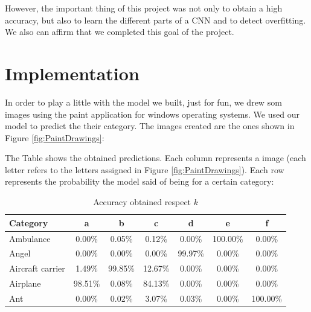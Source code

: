 \documentclass{article}
\begin{document}
However, the important thing of this project was not only to obtain a high accuracy, but also to learn the different parts of a CNN and to detect overfitting. We also can affirm that we completed this goal of the project.

\section{Implementation}
In order to play a little with the model we built, just for fun, we drew som images using the paint application for windows operating systems. We used our model to predict the their category. The images created are the ones shown in Figure \ref{fig:PaintDrawings}:


The Table shows the obtained predictions. Each column represents a image (each letter refers to the letters assigned in Figure \ref{fig:PaintDrawings}). Each row represents the probability the model said of being for a certain category:

\begin{table}[ht]
    \centering
    \begin{tabular}{|l|cccccc|}
        \hline
        \textbf{Category} & \textbf{a} & \textbf{b} & \textbf{c} & \textbf{d} & \textbf{e} & \textbf{f} \\
        \hline
        Ambulance           & 0.00\% & 0.05\% & 0.12\% & 0.00\% & 100.00\% & 0.00\%   \\ \hline
        Angel               & 0.00\% & 0.00\% & 0.00\% & 99.97\% & 0.00\% & 0.00\% \\ \hline
        Aircraft carrier    & 1.49\% & 99.85\% & 12.67\% & 0.00\% & 0.00\% & 0.00\%  \\ \hline
        Airplane            & 98.51\% & 0.08\% & 84.13\% & 0.00\% & 0.00\% & 0.00\%  \\ \hline
        Ant                 & 0.00\% & 0.02\% & 3.07\% & 0.03\% & 0.00\% & 100.00\%  \\ \hline

    \end{tabular}
    \caption{Accuracy obtained respect $k$}
    \label{tab:knn_results}
\end{table}
\end{document}
